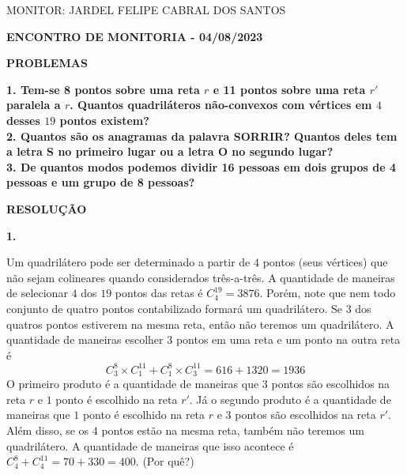 \documentclass[12pt, a4paper]{article}
\begin{document}
\begin{flushleft}

MONITOR: JARDEL FELIPE CABRAL DOS SANTOS\\[1cm] 
\end{flushleft}

\begin{center} \textbf{ENCONTRO DE MONITORIA - 04/08/2023\\[1cm]}
\end{center}

\begin{center}
\textbf{PROBLEMAS}
\end{center}

\textbf{1. Tem-se 8 pontos sobre uma reta \(r\) e 11 pontos sobre uma reta \(r'\) paralela a \(r\). Quantos quadriláteros não-convexos com vértices em \(4\) desses \(19\) pontos existem?} \\

\textbf{2. Quantos são os anagramas da palavra SORRIR? Quantos deles tem a letra S no primeiro lugar ou a letra O no segundo lugar?} \\

\textbf{3. De quantos modos podemos dividir 16 pessoas em dois grupos de 4 pessoas e um grupo de 8 pessoas?} \\

\begin{center}
\textbf{RESOLUÇÃO}
\end{center}

\textbf{1.}

Um quadrilátero pode ser determinado a partir de \(4\) pontos (seus vértices) que não sejam colineares quando considerados três-a-três. A quantidade de maneiras de selecionar \(4\) dos \(19\) pontos das retas é \(C^{19}_{4} = 3876\). Porém, note que nem todo conjunto de quatro pontos contabilizado formará um quadrilátero. Se \(3\) dos quatros pontos estiverem na mesma reta, então não teremos um quadrilátero. A quantidade de maneiras escolher \(3\) pontos em uma reta e um ponto na outra reta é \[C^{8}_{3}\times C^{11}_{1} + C^{8}_{1}\times C^{11}_{3}=616+1320=1936\]O primeiro produto é a quantidade de maneiras que \(3\) pontos são escolhidos na reta \(r\) e \(1\) ponto é escolhido na reta \(r'\). Já o segundo produto é a quantidade de maneiras que \(1\) ponto é escolhido na reta \(r\) e \(3\) pontos são escolhidos na reta \(r'\).\\

Além disso, se os \(4\) pontos estão na mesma reta, também não teremos um quadrilátero. A quantidade de maneiras que isso acontece é \(C^{8}_{4} + C^{11}_{4} = 70 + 330=400 \). (Por quê?) \\
\end{document}
